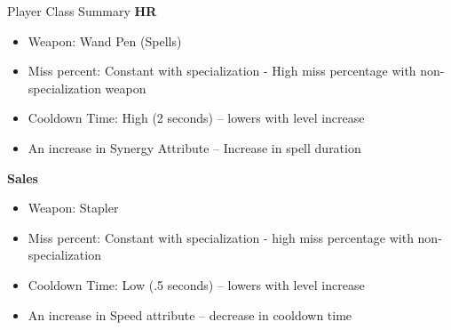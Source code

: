 \documentclass{report}
\begin{document}
\begin{chapter}{Player Class Summary}
\textbf{\large{HR}}
\begin{itemize}
  \item Weapon: Wand Pen (Spells)
  \item Miss percent: Constant with specialization - High miss percentage with non-specialization weapon
  \item Cooldown Time: High (2 seconds) -- lowers with level increase
  \item An increase in Synergy Attribute -- Increase in spell duration\\
\end{itemize}

\textbf{\large{Sales}}
\begin{itemize}
  \item Weapon: Stapler
  \item Miss percent: Constant with specialization - high miss percentage with non-specialization 
  \item Cooldown Time: Low (.5 seconds) -- lowers with level increase
  \item An increase in Speed attribute -- decrease in cooldown time
\end{itemize}
\end{chapter}
\end{document}
